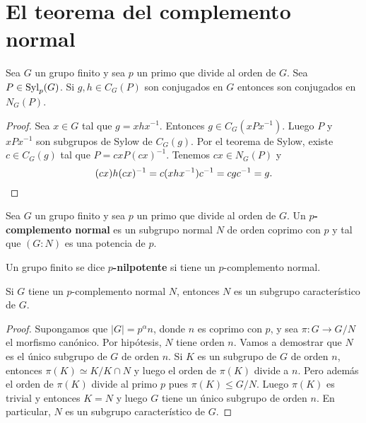 \chapter{El teorema del complemento normal}

\begin{lemma}
	\label{lemma:normal_complement}
	Sea $G$ un grupo finito y sea $p$ un primo que divide al orden de $G$. Sea
	$P\in\mathrm{Syl}_p(G)$. Si $g,h\in C_G(P)$ son conjugados en $G$ entonces son
	conjugados en $N_G(P)$.
\end{lemma}

\begin{proof}
	Sea $x\in G$ tal que $g=xhx^{-1}$. Entonces $g\in C_G(xPx^{-1})$. Luego $P$
	y $xPx^{-1}$ son subgrupos de Sylow de $C_G(g)$. Por el teorema de Sylow,
	existe $c\in C_G(g)$ tal que $P=cxP(cx)^{-1}$. Tenemos $cx\in N_G(P)$ y 
	\[
	(cx)h(cx)^{-1}=c(xhx^{-1})c^{-1}=cgc^{-1}=g.\qedhere
	\]
\end{proof}

\begin{definition}
	Sea $G$ un grupo finito y sea $p$ un primo que divide al orden de $G$. Un
	\textbf{$p$-complemento normal} es un subgrupo normal $N$ de orden coprimo
	con $p$ y tal que $(G:N)$ es una potencia de $p$.
\end{definition}

\begin{definition}
	Un grupo finito se dice \textbf{$p$-nilpotente} si tiene un $p$-complemento
	normal. 
\end{definition}

\begin{proposition}
	Si $G$ tiene un $p$-complemento normal $N$, entonces $N$ es un subgrupo
	característico de $G$.
\end{proposition}

\begin{proof}
	Supongamos que $|G|=p^\alpha n$, donde $n$ es coprimo con $p$, y sea
	$\pi\colon G\to G/N$ el morfismo canónico.  Por hipótesis, $N$ tiene orden
	$n$. Vamos a demostrar que $N$ es el único subgrupo de $G$ de orden $n$. Si
	$K$ es un subgrupo de $G$ de orden $n$, entonces  $\pi(K)\simeq K/K\cap N$
	y luego el orden de $\pi(K)$ divide a $n$. Pero además el orden de $\pi(K)$
	divide al primo $p$ pues $\pi(K)\leq G/N$. Luego $\pi(K)$ es trivial y
	entonces $K=N$ y luego $G$ tiene un único subgrupo de orden $n$. En
	particular, $N$ es un subgrupo característico de $G$.
\end{proof}



